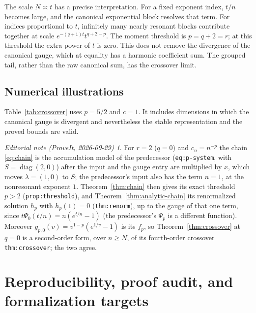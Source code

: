 \documentclass[11pt,a4paper]{article}
\numberwithin{equation}{section}
\theoremstyle{definition}
\theoremstyle{remark}
\newtheorem*{ednote}{Editorial note (ProveIt, 2026-09-29)}
\begin{document}
The scale $N\asymp t$ has a precise interpretation. For a fixed exponent
index, $t/n$ becomes large, and the canonical exponential block resolves
that term. For indices proportional to $t$, infinitely many nearly
resonant blocks contribute together at scale
$e^{-(q+1)t}t^{q+2-p}$. The moment threshold is $p=q+2=r$; at this threshold
the extra power of $t$ is zero. This does not remove the divergence of the
canonical gauge, which at equality has a harmonic coefficient sum.
The grouped tail, rather than the raw canonical sum, has the crossover
limit.

\subsection{Numerical illustrations}
Table~\ref{tab:crossover} uses $p=5/2$ and $c=1$. It includes dimensions in
which the canonical gauge is divergent and nevertheless the stable
representation and the proved bounds are valid.
\begin{table}[htbp]
\centering\small

\caption{Crossover values and the upper bound in \eqref{eq:trapezoid}.
The approximation is always below the scaled tail. Values are rounded;
the inequalities are theorems, while these evaluations use ordinary
high-precision arithmetic, not directed-rounding intervals.}
\label{tab:crossover}
\end{table}

\begin{ednote}
For $r=2$ ($q=0$) and $c_n=n^{-p}$ the chain \eqref{eq:chain} is the
accumulation model of the predecessor \cite{repo-hahn}
(\texttt{eq:p-system}, with $S=\operatorname{diag}(2,0)$) after the input
and the gauge entry are multiplied by $x$, which moves $\lambda=(1,0)$ to
$S$; the predecessor's input also has the term $n=1$, at the nonresonant
exponent $1$. Theorem~\ref{thm:chain} then gives its exact threshold $p>2$
(\texttt{prop:threshold}), and Theorem~\ref{thm:analytic-chain} its
renormalized solution $h_p$ with $h_p(1)=0$ (\texttt{thm:renorm}), up to
the gauge of that one term, since $t\Psi_0(t/n)=n(e^{t/n}-1)$ (the
predecessor's $\Psi_p$ is a different function). Moreover
$g_{p,0}(v)=v^{1-p}(e^{1/v}-1)$ is its $f_p$, so
Theorem~\ref{thm:crossover} at $q=0$ is a second-order form, over
$n\geq N$, of its fourth-order crossover \texttt{thm:crossover}; the two
agree.
\end{ednote}
\section{Reproducibility, proof audit, and formalization targets}
\label{sec:verification}
\end{document}
